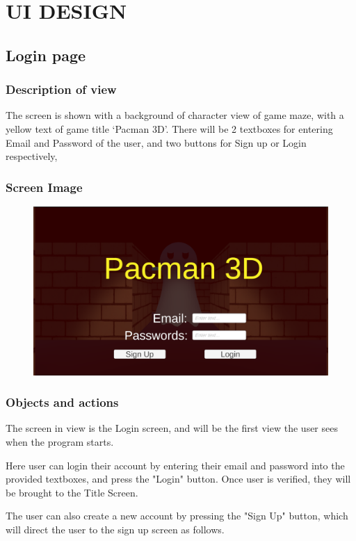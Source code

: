 \documentclass[11pt]{article}
\begin{document}
\section{UI DESIGN}

\subsection{Login page}
\subsubsection{Description of view}
The screen is shown with a background of character view of game maze, with a yellow text of game title `Pacman 3D'. There will be 2 textboxes for entering Email and Password of the user, and two buttons for Sign up or Login respectively,
\subsubsection{Screen Image}
\begin{figure}[H]
    \centering
    \includegraphics*[scale=0.2]{UI0.0Login.png}
\end{figure}
\subsubsection{Objects and actions}
The screen in view is the Login screen, and will be the first view the user sees when the program starts. 

Here user can login their account by entering their email and password into the provided textboxes, and press the "Login" button. Once user is verified, they will be brought to the Title Screen.

The user can also create a new account by pressing the "Sign Up" button, which will direct the user to the sign up screen as follows.
\end{document}
